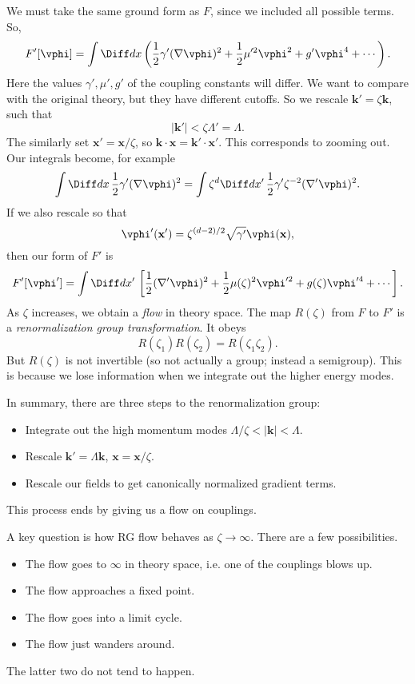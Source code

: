 \documentclass[12pt]{article}
\begin{document}
We must take the same ground form as $F$, since we included all possible terms. So,
\[
	F'[\vphi] = \int \Diff d x \left( \frac{1}{2} \gamma'(\nabla \vphi)^2 + \frac{1}{2} \mu'^2 \vphi^2 + g' \vphi^{4} + \cdots \right).
\]
Here the values $\gamma', \mu', g'$ of the coupling constants will differ. We want to compare with the original theory, but they have different cutoffs. So we rescale $\mathbf{k}' =  \zeta \mathbf{k}$, such that
\[
|\mathbf{k}'| < \zeta \Lambda' = \Lambda.
\]
The similarly set $\mathbf{x}' = \mathbf{x}/\zeta$, so $\mathbf{k} \cdot \mathbf{x} = \mathbf{k}' \cdot \mathbf{x}'$. This corresponds to zooming out. Our integrals become, for example
\[
\int \Diff d x \, \frac{1}{2} \gamma' (\nabla \vphi)^2 = \int \zeta^{d} \Diff d x' \, \frac{1}{2} \gamma' \zeta^{-2} (\nabla' \vphi)^2.
\]
If we also rescale so that
\[
	\vphi'(\mathbf{x}') = \zeta^{(d-2)/2} \sqrt{\gamma'} \vphi(\mathbf{x}),
\]
then our form of $F'$ is
\[
	F'[\vphi'] = \int \Diff d x' \, \left[ \frac{1}{2} (\nabla' \vphi)^2 + \frac{1}{2} \mu(\zeta)^2 \vphi'^2 + g(\zeta) \vphi'^{4} + \cdots \right].
\]
As $\zeta$ increases, we obtain a \emph{flow} in theory space. The map $R(\zeta)$ from $F$ to $F'$ is a \emph{renormalization group transformation}. It obeys
\[
R(\zeta_1) R(\zeta_2) = R(\zeta_1 \zeta_2).
\]
But $R(\zeta)$ is not invertible (so not actually a group; instead a semigroup). This is because we lose information when we integrate out the higher energy modes.

In summary, there are three steps to the renormalization group:
\begin{itemize}
	\item Integrate out the high momentum modes $\Lambda/\zeta < |\mathbf{k}| < \Lambda$.
	\item Rescale $\mathbf{k}' = \Lambda \mathbf{k}$, $\mathbf{x} = \mathbf{x}/\zeta$.
	\item Rescale our fields to get canonically normalized gradient terms.
\end{itemize}
This process ends by giving us a flow on couplings.

A key question is how RG flow behaves as $\zeta \to \infty$. There are a few possibilities.
\begin{itemize}
	\item The flow goes to $\infty$ in theory space, i.e. one of the couplings blows up.
	\item The flow approaches a fixed point.
	\item The flow goes into a limit cycle.
	\item The flow just wanders around.
\end{itemize}
The latter two do not tend to happen.
\end{document}
